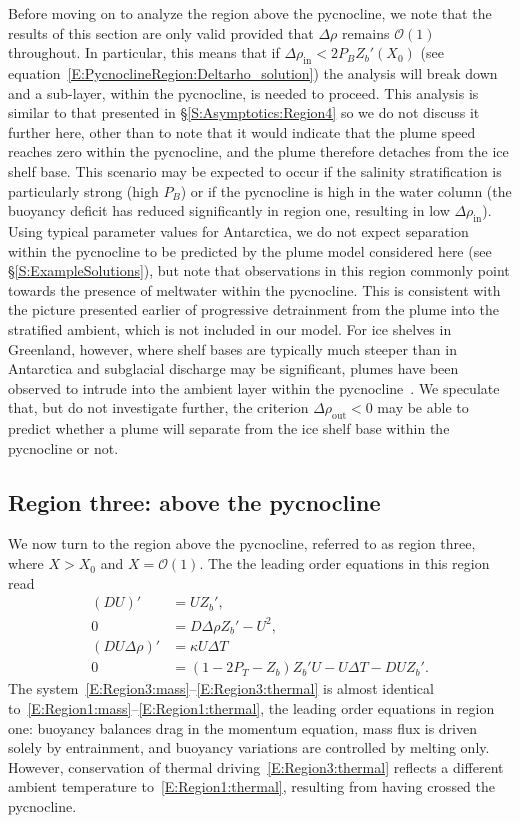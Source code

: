 \documentclass[openacc]{rsproca_new}%
\newcommand{\order}[1]{\mathcal{O}(#1)}
\newcommand{\Pb}{\textit{P}_B}  %
\newcommand{\Pt}{\textit{P}_T}
\renewcommand{\in}{\text{in}} %
\newcommand{\out}{\text{out}}
\begin{document}
Before moving on to analyze the  region above the pycnocline, we note that the results of this section are only valid provided that $\Delta \rho$ remains $\order{1}$ throughout. In particular, this means that if $\Delta \rho_{\in} < 2 \Pb Z_b'(X_0)$ (see equation~\eqref{E:PycnoclineRegion:Deltarho_solution}) the analysis will break down and a sub-layer, within the pycnocline, is needed to proceed. This analysis is similar to that presented in \S\ref{S:Asymptotics:Region4} so we do not discuss it further here, other than to note that it would indicate that the plume speed reaches zero within the pycnocline, and the plume therefore detaches from the ice shelf base. This scenario may be expected to occur if the salinity stratification is particularly strong (high $\Pb$) or if the pycnocline is high in the water column (the buoyancy deficit has reduced significantly in region one, resulting in low $\Delta \rho_{\in}$). Using typical parameter values for Antarctica, we do not expect separation within the pycnocline to be predicted by the plume model considered here (see \S\ref{S:ExampleSolutions}), but note that observations in this region commonly point towards the presence of meltwater within the pycnocline. This is consistent with the picture presented earlier of progressive detrainment from the plume into the stratified ambient, which is not included in our model. For ice shelves in Greenland, however, where shelf bases are typically much steeper than in Antarctica and subglacial discharge may be significant, plumes have been observed to intrude into the ambient layer within the pycnocline~\citep{Straneo2011NatureGeo}. We speculate that, but do not investigate further, the criterion $\Delta \rho_\out < 0$  may be able to predict whether a plume will separate from the ice shelf base within the pycnocline or not.

\subsection{Region three: above the pycnocline}\label{S:Asymptotics:Region3}
We now turn to the region above the pycnocline, referred to as region three, where $X > X_0$ and $X = \order{1}$. The the leading order equations in this region read
\begin{align}
 (DU)' &= U Z_b',\label{E:Region3:mass}\\
0 &= D \Delta \rho Z_b' - U^2, \label{E:Region3:mom}\\
(DU\Delta \rho)'  &=\kappa U \Delta T\label{E:Region3:buoyancy}\\
0&= (1  - 2\Pt -  Z_b)Z_b'U- U\Delta T - DU Z_b'.\label{E:Region3:thermal}
\end{align}
The system~\eqref{E:Region3:mass}--\eqref{E:Region3:thermal} is almost identical to~\eqref{E:Region1:mass}--\eqref{E:Region1:thermal}, the leading order equations in region one: buoyancy balances drag in the momentum equation, mass flux is driven solely by entrainment, and buoyancy variations are controlled by melting only. However, conservation of thermal driving~\eqref{E:Region3:thermal} reflects a different ambient temperature to~\eqref{E:Region1:thermal}, resulting from having crossed the pycnocline.
\end{document}
